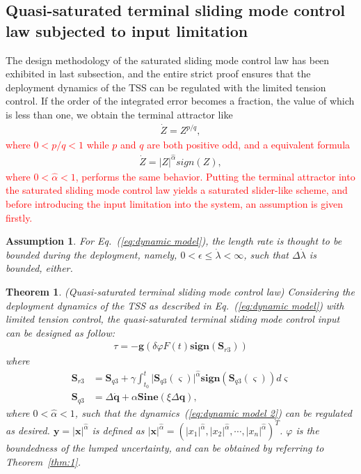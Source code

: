 \documentclass[3p]{elsarticle}
\theoremstyle{plain}
\newtheorem{myas}{Assumption}
\newtheorem{mythm}{Theorem}
\theoremstyle{remark}
\begin{document}
\subsection{Quasi-saturated terminal sliding mode control law subjected to input limitation}
The design methodology of the saturated sliding mode control law has been exhibited in last subsection, and the entire strict proof ensures that the deployment dynamics of the TSS can be regulated with the limited tension control. If the order of the integrated error becomes a fraction, the value of which is less than one, we obtain the terminal attractor like
\begin{align}
\dot Z = Z^{p/q},
\end{align}
\textcolor{red}{where $0<p/q<1$ while $p$ and $q$ are both positive odd, and a equivalent formula}
\begin{align}
\dot Z = \vert Z\vert^{\hat\alpha} {sign}(Z),
\end{align}
\textcolor{red}{where $0<\hat \alpha<1$, performs the same behavior. Putting the terminal attractor into the saturated sliding mode control law yields a saturated slider-like scheme, and before introducing the input limitation into the system, an assumption is given firstly.}
\begin{myas}\label{as:1}
For Eq.~(\ref{eq:dynamic model}), the length rate is thought to be bounded during the deployment, namely, $0<\epsilon\le\dot \lambda<\infty$, such that $\Delta \dot \lambda$ is bounded, either.
\end{myas}
\begin{mythm}\label{thm:2}(Quasi-saturated terminal sliding mode control law)
Considering the deployment dynamics of the TSS as described in Eq.~(\ref{eq:dynamic model}) with limited tension control, the quasi-saturated terminal sliding mode control input can be designed as follow:
\begin{align}
\tau = -\bm{g}(\delta\varphi F(t) \bm{sign}(\bm S_{r3}))
\end{align}
where
\begin{align}
\bm S_{r3} &= \bm S_{q3}+\gamma\int^t_{t_0}\vert \bm S_{q3}(\varsigma)\vert^{\hat\alpha}  \bm{sign}(\bm S_{q3}(\varsigma))d\varsigma\label{eq:Sr3}\\
\bm S_{q3} &= \Delta \dot {\bm q}+\alpha \bm{Sine}(\xi\Delta \bm q),\label{eq:Sq3}
\end{align}
where $0<\hat\alpha< 1$, such that the dynamics~(\ref{eq:dynamic model 2}) can be regulated as desired. $\bm y=\vert \bm x\vert^{\hat\alpha}$ is defined as $\vert \bm x\vert^{\hat\alpha} =\left(\vert x_1\vert^{\hat\alpha},\vert x_2\vert^{\hat\alpha},\cdots,\vert x_n\vert^{\hat\alpha}\right)^T$. $\varphi$ is the boundedness of the lumped uncertainty, and can be obtained by referring to Theorem~\ref{thm:1}.
\end{mythm}
\end{document}
